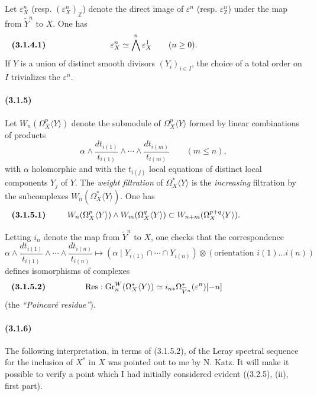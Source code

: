 \documentclass[10pt]{article}
\newcommand{\Z}{\mathbb Z}
\newcommand{\Gr}{\operatorname{Gr}}
\newcommand{\Res}{\operatorname{Res}}
\begin{document}
Let $\varepsilon_X^n$ (resp. $(\varepsilon_X^n)_\Z$) denote the direct image of $\varepsilon^n$ (resp. $\varepsilon_\Z^n$) under the map from $\widetilde Y^n$ to $X$. One has
\[
\makebox[\textwidth][s]{\textbf{(3.1.4.1)}\hfill$\displaystyle \varepsilon_X^n\simeq\bigwedge^n\varepsilon_X^1\qquad(n\ge0).$\hfill\phantom{\textbf{(3.1.4.1)}}}
\]
If $Y$ is a union of distinct smooth divisors $(Y_i)_{i\in I}$, the choice of a total order on $I$ trivializes the $\varepsilon^n$.

\paragraph{(3.1.5)} Let $W_n(\Omega_X^p\langle Y\rangle)$ denote the submodule of $\Omega_X^p\langle Y\rangle$ formed by linear combinations of products
\[
\alpha\wedge\frac{dt_{i(1)}}{t_{i(1)}}\wedge\cdots\wedge
\frac{dt_{i(m)}}{t_{i(m)}}\qquad(m\le n),
\]
with $\alpha$ holomorphic and with the $t_{i(j)}$ local equations of distinct local components $Y_j$ of $Y$. The \emph{weight filtration} of $\Omega_X^*\langle Y\rangle$ is the \emph{increasing} filtration by the subcomplexes $W_n(\Omega_X^*\langle Y\rangle)$. One has
\[
\makebox[\textwidth][s]{\textbf{(3.1.5.1)}\hfill$\displaystyle W_n(\Omega_X^p\langle Y\rangle)\wedge W_m(\Omega_X^q\langle Y\rangle)\subset W_{n+m}(\Omega_X^{p+q}\langle Y\rangle).$\hfill\phantom{\textbf{(3.1.5.1)}}}
\]

Letting $i_n$ denote the map from $\widetilde Y^n$ to $X$, one checks that the correspondence
\[
\alpha\wedge\frac{dt_{i(1)}}{t_{i(1)}}\wedge\cdots\wedge
\frac{dt_{i(n)}}{t_{i(n)}}
\longmapsto
(\alpha\mid Y_{i(1)}\cap\cdots\cap Y_{i(n)})\otimes
(\text{orientation }i(1)\ldots i(n))
\]
defines isomorphisms of complexes
\[
\makebox[\textwidth][s]{\textbf{(3.1.5.2)}\hfill$\displaystyle \Res:\Gr_n^W(\Omega_X^*\langle Y\rangle)\simeq i_{n*}\Omega_{\widetilde Y^n}^*(\varepsilon^n)[-n]$\hfill\phantom{\textbf{(3.1.5.2)}}}
\]
(the \emph{``Poincaré residue''}).

\paragraph{(3.1.6)} The following interpretation, in terms of (3.1.5.2), of the Leray spectral sequence for the inclusion of $X^*$ in $X$ was pointed out to me by N. Katz. It will make it possible to verify a point which I had initially considered evident ((3.2.5), (ii), first part).
\end{document}
